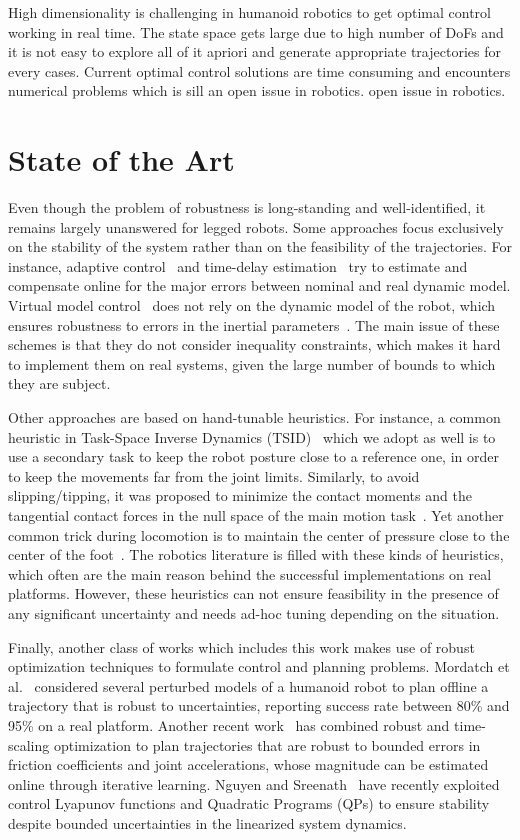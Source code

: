 High dimensionality is challenging in humanoid robotics to get optimal control working in real time. The state space gets large due to high number of DoFs and it is not easy to explore all of it apriori and generate appropriate trajectories for every cases. Current optimal control solutions are time consuming and encounters numerical problems which is sill an open issue in robotics.
open issue in robotics.

\section{State of the Art}
\label{sec:soa_robust}
Even though the problem of robustness is long-standing and well-identified, it remains largely unanswered for legged robots. 
Some approaches focus exclusively on the stability of the system rather than on the feasibility of the trajectories.
For instance, adaptive control~\cite{Kelly1989} and time-delay estimation~\cite{Jin2008} try to estimate and compensate online for the major errors between nominal and real dynamic model.
Virtual model control~\cite{Pratt} does not rely on the dynamic model of the robot, which ensures robustness to errors in the inertial parameters~\cite{dietrich2013multi}. 
The main issue of these schemes is that they do not consider inequality constraints, which makes it hard to implement them on real systems, given the large number of bounds to which they are subject.

Other approaches are based on hand-tunable heuristics. For instance, a common heuristic in Task-Space Inverse Dynamics (TSID)~\cite{DelPrete2014c} which we adopt as well is to use a secondary task to keep the robot posture close to a reference one, in order to keep the movements far from the joint limits. 
Similarly, to avoid slipping/tipping, it was proposed to minimize the contact moments and the tangential contact forces in the null space of the main motion task~\cite{Righetti2010}. 
Yet another common trick during locomotion is to maintain the center of pressure close to the center of the foot~\cite{Kajita2003}.
The robotics literature is filled with these kinds of heuristics, which often are the main reason behind the successful implementations on real platforms.
However, these heuristics can not ensure feasibility in the presence of any significant uncertainty and needs ad-hoc tuning depending on the situation.

Finally, another class of works which includes this work makes use of robust optimization techniques to formulate control and planning problems.
Mordatch et al.~\cite{Mordatch2015} considered several perturbed models of a humanoid robot to plan offline a trajectory that is robust to uncertainties, reporting success rate between 80\% and 95\% on a real platform. 
Another recent work~\cite{Luo} has combined robust and time-scaling optimization to plan trajectories that are robust to bounded errors in friction coefficients and joint accelerations, whose magnitude can be estimated online through iterative learning.
Nguyen and Sreenath~\cite{Nguyen} have recently exploited control Lyapunov functions and Quadratic Programs (QPs) to ensure stability despite bounded uncertainties in the linearized system dynamics. 

